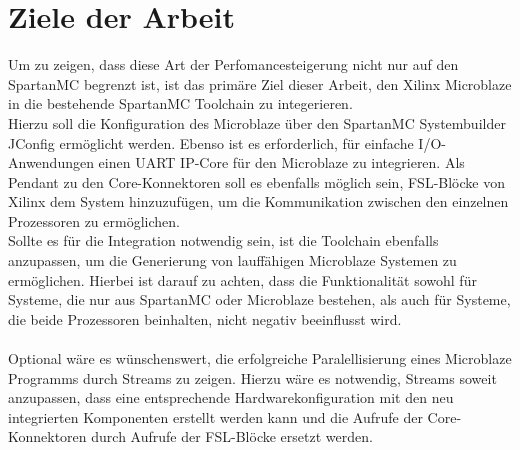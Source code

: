 \section{Ziele der Arbeit}
Um zu zeigen, dass diese Art der Perfomancesteigerung nicht nur auf den SpartanMC begrenzt ist, ist das primäre Ziel dieser Arbeit, den Xilinx Microblaze 
in die bestehende SpartanMC Toolchain zu integerieren.\\
Hierzu soll die Konfiguration des Microblaze über den SpartanMC Systembuilder JConfig ermöglicht werden. Ebenso ist es erforderlich, für einfache
I/O-Anwendungen einen UART IP-Core für den Microblaze zu integrieren. Als Pendant zu den Core-Konnektoren soll es ebenfalls möglich sein, FSL-Blöcke von Xilinx
dem System hinzuzufügen, um die Kommunikation zwischen den einzelnen Prozessoren zu ermöglichen.\\
Sollte es für die Integration notwendig sein, ist die Toolchain ebenfalls anzupassen, um die Generierung von lauffähigen Microblaze Systemen zu ermöglichen.
Hierbei ist darauf zu achten, dass die Funktionalität sowohl für Systeme, die nur aus SpartanMC oder Microblaze bestehen, als auch für Systeme, die beide Prozessoren beinhalten, 
nicht negativ beeinflusst wird.\\\\
Optional wäre es wünschenswert, die erfolgreiche Paralellisierung eines Microblaze Programms durch \textmu\/Streams zu zeigen. Hierzu wäre es notwendig, 
\textmu\/Streams soweit anzupassen, dass eine entsprechende Hardwarekonfiguration mit den neu integrierten Komponenten erstellt werden kann und
die Aufrufe der Core-Konnektoren durch Aufrufe der FSL-Blöcke ersetzt werden.
